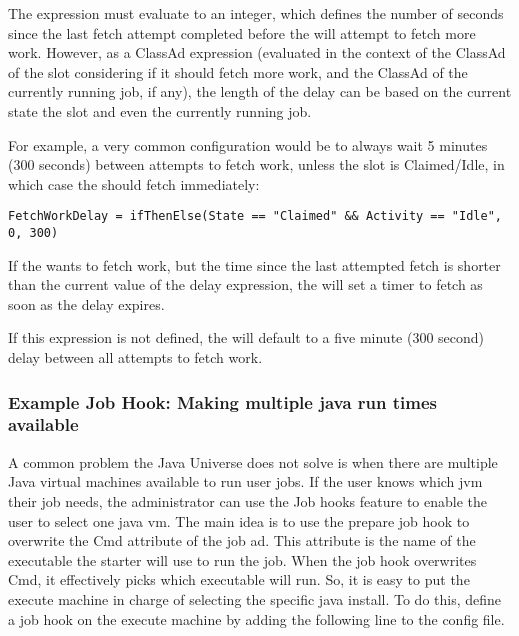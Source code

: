 The  expression must evaluate to an integer,
which defines the number of seconds since the last fetch attempt
completed before the  will attempt to fetch more work.
However, as a ClassAd expression (evaluated in the context of the
ClassAd of the slot considering if it should fetch more work, and the
ClassAd of the currently running job, if any), the length of the delay
can be based on the current state the slot and even the currently
running job.

For example, a very common configuration would be to always wait 5
minutes (300 seconds) between attempts to fetch work, unless the slot
is Claimed/Idle, in which case the  should fetch
immediately:

\footnotesize
\begin{verbatim}
FetchWorkDelay = ifThenElse(State == "Claimed" && Activity == "Idle", 0, 300) 
\end{verbatim}
\normalsize

If the  wants to fetch work, but the time since the
last attempted fetch is shorter than the current value of the delay
expression, the  will set a timer to fetch as soon as
the delay expires.

If this expression is not defined, the  will default to
a five minute (300 second) delay between all attempts to fetch work.

\subsubsection{\label{sec:job-hooks-java-example}
Example Job Hook: Making multiple java run times available}

A common problem the Java Universe does not solve is when there
are multiple Java virtual machines available to run user jobs.  If
the user knows which jvm their job needs, the administrator can
use the Job hooks feature to enable the user to select one java vm.
The main idea is to use the prepare job hook to overwrite the
Cmd attribute of the job ad.  This attribute is the name of the
executable the starter will use to run the job.  When the job
hook overwrites Cmd, it effectively picks which executable will run.  So,
it is easy to put the execute machine in charge of selecting the specific
java install.  To do this, define a job hook on the execute machine
by adding the following line to the config file.


